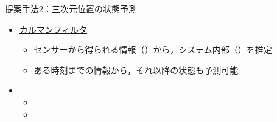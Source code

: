 \begin{frame}{提案手法2：三次元位置の状態予測}
    \begin{itemize}
        \item \uline{カルマンフィルタ}
        \begin{itemize}
            \item センサーから得られる情報（）から，システム内部（）を推定
            \item ある時刻までの情報から，それ以降の状態も予測可能
        \end{itemize}
    \end{itemize}
    \begin{itemize}
        \item[\phantom{}] 
        \begin{itemize}
            \item[\phantom{}] \phantom{拡張カルマンフィルタ：非線形な関係の扱いを可能に}
            \item[\phantom{}] \phantom{可変的な観測変数：毎時刻に変化する観測変数の次元数に対応}
        \end{itemize}
    \end{itemize} 
\end{frame}
